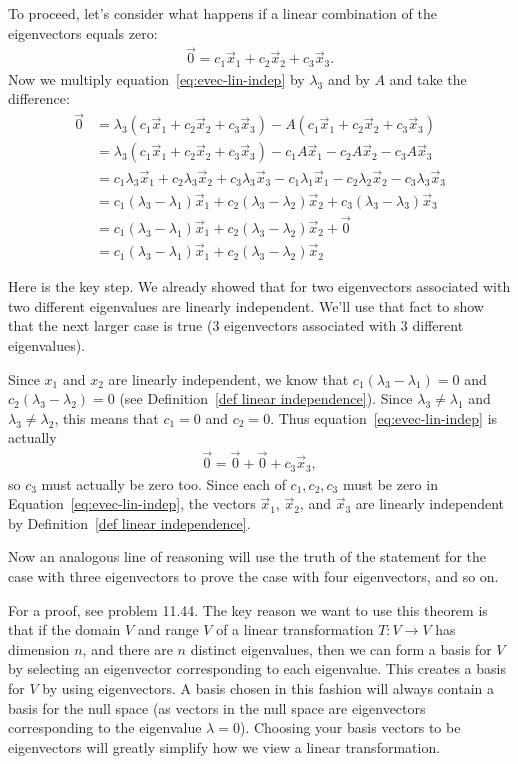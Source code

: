 {To proceed, let's consider what happens if a linear combination of the eigenvectors equals zero:
\begin{align}
  \vec 0=c_1\vec x_1+c_2\vec x_2+c_3\vec x_3.\label{eq:evec-lin-indep}
\end{align}
Now we multiply equation~\eqref{eq:evec-lin-indep} by $\lambda_3$ and by $A$ and take the difference:
\begin{align*}
  \vec 0&=\lambda_3(c_1\vec x_1+c_2\vec x_2+c_3\vec x_3)-A(c_1\vec x_1+c_2\vec x_2+c_3\vec x_3)\\
  &=\lambda_3(c_1\vec x_1+c_2\vec x_2+c_3\vec x_3)-c_1A\vec x_1-c_2A\vec x_2-c_3A\vec x_3\\
  &=c_1\lambda_3\vec x_1+c_2\lambda_3\vec x_2+c_3\lambda_3\vec x_3-c_1\lambda_1\vec x_1-c_2\lambda_2\vec x_2-c_3\lambda_3\vec x_3\\
  &= c_1(\lambda_3-\lambda_1)\vec x_1+c_2(\lambda_3-\lambda_2)\vec x_2+c_3(\lambda_3-\lambda_3)\vec x_3\\
  &=  c_1(\lambda_3-\lambda_1)\vec x_1+c_2(\lambda_3-\lambda_2)\vec x_2+\vec 0\\
  &=  c_1(\lambda_3-\lambda_1)\vec x_1+c_2(\lambda_3-\lambda_2)\vec x_2
\end{align*}

Here is the key step.  We already showed that for two eigenvectors associated with two different eigenvalues are linearly independent.  We'll use that fact to show that the next larger case is true (3 eigenvectors associated with 3 different eigenvalues).

Since $x_1$ and $x_2$ are linearly independent, we know that $c_1(\lambda_3-\lambda_1)=0$ and $c_2(\lambda_3-\lambda_2)=0$ (see Definition~\ref{def linear independence}).  Since $\lambda_3\neq \lambda_1$ and $\lambda_3\neq \lambda_2$, this means that $c_1=0$ and $c_2=0$.  Thus equation~\eqref{eq:evec-lin-indep} is actually
\begin{align*}
  \vec 0=\vec 0 + \vec 0+c_3\vec x_3,
\end{align*}
so $c_3$ must actually be zero too.  Since each of $c_1,c_2,c_3$ must be zero in Equation~\eqref{eq:evec-lin-indep}, the vectors $\vec x_1$, $\vec x_2$, and $\vec x_3$ are linearly independent by Definition~\ref{def linear independence}.

Now an analogous line of reasoning will use the truth of the statement for the case with three eigenvectors to prove the case with four eigenvectors, and so on.
}
For a proof, see problem 11.44. The key reason we want to use this theorem is that if the domain $V$ and range $V$ of a linear transformation $T\colon V\to V$ has dimension $n$, and there are $n$ distinct eigenvalues, then we can form a basis for $V$ by selecting an eigenvector corresponding to each eigenvalue. This creates a basis for $V$ by using eigenvectors. A basis chosen in this fashion will always contain a basis for the null space (as vectors in the null space are eigenvectors corresponding to the eigenvalue $\lambda = 0$). Choosing your basis vectors to be eigenvectors will greatly simplify how we view a linear transformation.


